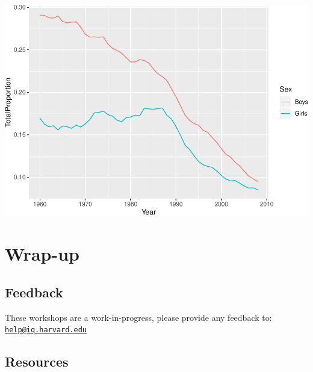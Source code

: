 \documentclass[]{book}
\begin{document}
\includegraphics{R/Rintro/figures/unnamed-chunk-79-1.pdf}

\section{Wrap-up}\label{wrap-up-1}

\subsection{Feedback}\label{feedback-1}

These workshops are a work-in-progress, please provide any feedback to:
\href{mailto:help@iq.harvard.edu}{\nolinkurl{help@iq.harvard.edu}}

\subsection{Resources}\label{resources-2}
\end{document}
